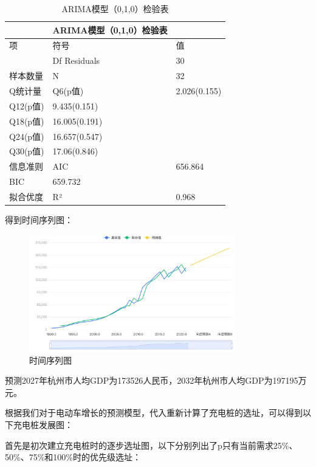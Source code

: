 \documentclass[12pt, a4paper, oneside]{ctexart}
\begin{document}
\begin{table}[H]
  \centering
  \begin{tabularx}{0.9\textwidth}{XXX}
  \toprule
  & ARIMA模型（0,1,0）检验表 & \\
  \midrule
  项 & 符号 & 值 \\
  & Df Residuals & 30 \\
  样本数量 & N & 32 \\
  Q统计量 & Q6(p值) & 2.026(0.155) \\
  Q12(p值) & 9.435(0.151) & \\
  Q18(p值) & 16.005(0.191) & \\
  Q24(p值) & 16.657(0.547) & \\
  Q30(p值) & 17.06(0.846) & \\
  信息准则 & AIC & 656.864 \\
  BIC & 659.732 & \\
  拟合优度 & R² & 0.968 \\
  \bottomrule
  \end{tabularx}
  \caption{ARIMA模型（0,1,0）检验表}
  \label{tab:arima}
\end{table}

得到时间序列图：

\begin{figure}[H]
  \centering
  \includegraphics[width=0.8\textwidth]{pic/时间序列图.png}
  \caption{时间序列图}
  \label{fig:时间序列图}
\end{figure}



预测2027年杭州市人均GDP为173526人民币，2032年杭州市人均GDP为197195万元。


根据我们对于电动车增长的预测模型，代入重新计算了充电桩的选址，可以得到以下充电桩发展图：

首先是初次建立充电桩时的逐步选址图，以下分别列出了p只有当前需求25\%、50\%、75\%和100\%时的优先级选址：
\end{document}

